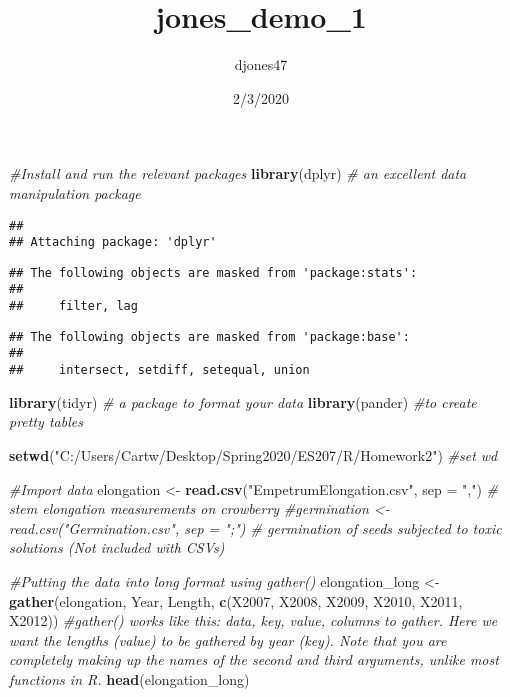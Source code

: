 \documentclass[
]{article}
\title{jones\_demo\_1}
\author{djones47}
\date{2/3/2020}
\newenvironment{Shaded}{\begin{snugshade}}{\end{snugshade}}
\newcommand{\CommentTok}[1]{\textcolor[rgb]{0.56,0.35,0.01}{\textit{#1}}}
\newcommand{\DataTypeTok}[1]{\textcolor[rgb]{0.13,0.29,0.53}{#1}}
\newcommand{\KeywordTok}[1]{\textcolor[rgb]{0.13,0.29,0.53}{\textbf{#1}}}
\newcommand{\NormalTok}[1]{#1}
\newcommand{\StringTok}[1]{\textcolor[rgb]{0.31,0.60,0.02}{#1}}
\begin{document}
\maketitle

\begin{Shaded}
\begin{Highlighting}[]
\CommentTok{#Install and run the relevant packages}
\KeywordTok{library}\NormalTok{(dplyr) }\CommentTok{# an excellent data manipulation package}
\end{Highlighting}
\end{Shaded}

\begin{verbatim}
## 
## Attaching package: 'dplyr'
\end{verbatim}

\begin{verbatim}
## The following objects are masked from 'package:stats':
## 
##     filter, lag
\end{verbatim}

\begin{verbatim}
## The following objects are masked from 'package:base':
## 
##     intersect, setdiff, setequal, union
\end{verbatim}

\begin{Shaded}
\begin{Highlighting}[]
\KeywordTok{library}\NormalTok{(tidyr) }\CommentTok{# a package to format your data}
\KeywordTok{library}\NormalTok{(pander) }\CommentTok{#to create pretty tables}

\KeywordTok{setwd}\NormalTok{(}\StringTok{"C:/Users/Cartw/Desktop/Spring2020/ES207/R/Homework2"}\NormalTok{) }\CommentTok{#set wd}

\CommentTok{#Import data }
\NormalTok{elongation <-}\StringTok{ }\KeywordTok{read.csv}\NormalTok{(}\StringTok{"EmpetrumElongation.csv"}\NormalTok{, }\DataTypeTok{sep =} \StringTok{","}\NormalTok{) }\CommentTok{# stem elongation measurements on crowberry}
\CommentTok{#germination <- read.csv("Germination.csv", sep = ";") # germination of seeds subjected to toxic solutions (Not included with CSVs)}

\CommentTok{#Putting the data into long format using gather()}
\NormalTok{elongation_long <-}\StringTok{ }\KeywordTok{gather}\NormalTok{(elongation, Year, Length, }\KeywordTok{c}\NormalTok{(X2007, X2008, X2009, X2010, X2011, X2012)) }
  \CommentTok{#gather() works like this: data, key, value, columns to gather. Here we want the lengths (value) to be gathered by year (key). Note that you are completely making up the names of the second and third arguments, unlike most functions in R.}
\KeywordTok{head}\NormalTok{(elongation_long)}
\end{Highlighting}
\end{Shaded}
\end{document}
